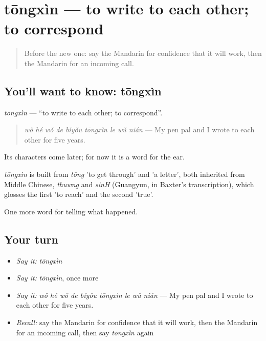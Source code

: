 \section[tōngxìn]{tōngxìn — to write to each other; to correspond}

\label{lesson:ZH-C319-tongxin}



\begin{quote}
Before the new one: say the Mandarin for confidence that it will work, then the Mandarin for an incoming call.
\end{quote}

\subsection*{You'll want to know: tōngxìn}
\emph{tōngxìn} — \textquotedblleft{}to write to each other; to correspond\textquotedblright{}.

\begin{quote}
\emph{wǒ hé wǒ de bǐyǒu tōngxìn le wǔ nián} — My pen pal and I wrote to each other for five years.
\end{quote}

Its characters come later; for now it is a word for the ear.

\begin{cousinweb}
\emph{tōngxìn} is built from \emph{tōng} 'to get through' and  'a letter', both inherited from Middle Chinese, \emph{thuwng} and \emph{sinH} (Guangyun, in Baxter's transcription), which glosses the first 'to reach' and the second 'true'.
\end{cousinweb}

\begin{grammarlens}[title={What you've built}]
One more word for telling what happened.
\end{grammarlens}

\subsection*{Your turn}
\begin{itemize}
\raggedright
  \item \emph{Say it:} \emph{tōngxìn}
  \item \emph{Say it:} \emph{tōngxìn}, once more
  \item \emph{Say it:} \emph{wǒ hé wǒ de bǐyǒu tōngxìn le wǔ nián} — My pen pal and I wrote to each other for five years.
  \item \emph{Recall:} say the Mandarin for confidence that it will work, then the Mandarin for an incoming call, then say \emph{tōngxìn} again
\end{itemize}

